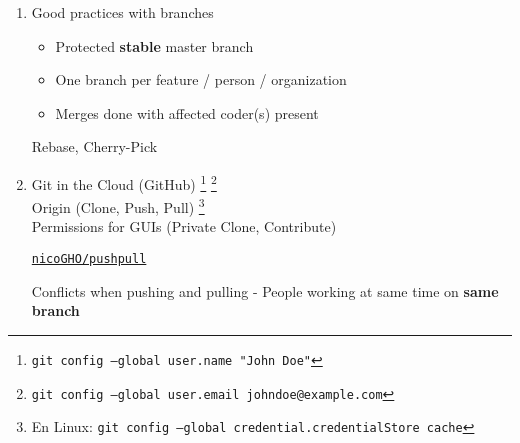 \documentclass[12pt,a4paper]{article}
\begin{document}
\begin{enumerate}
		
		
		\newpage
		\item Good practices with branches
		\begin{itemize}
			\item Protected \textbf{stable} master branch
			
			\item One branch per feature / person / organization
			
			\item Merges done with affected coder(s) present
		\end{itemize}
		
		
		\vspace{10cm}
		Rebase, Cherry-Pick

		
		\newpage
		\item Git in the Cloud (GitHub) \footnote{\texttt{git config --global user.name "John Doe"}} \footnote{\texttt{git config --global user.email johndoe@example.com}} \\ Origin (Clone, Push, Pull) \footnote{En Linux: \texttt{git config --global credential.credentialStore cache}} \\ Permissions for GUIs (Private Clone, Contribute) 
		
		
		\vspace{1cm}
		\href{https://github.com/nicoGHO/pushpull}{\texttt{nicoGHO/pushpull}}
		
		\vspace{9cm}
		Conflicts when pushing and pulling - People working at same time on \textbf{same branch}
		
		\vspace{1cm}
		
		

\end{enumerate}
\end{document}
